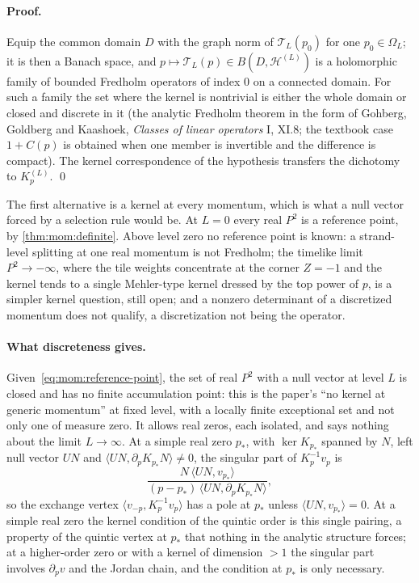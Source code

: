 \paragraph{Proof.}
Equip the common domain $D$ with the graph norm of $\mathcal T_L(p_0)$ for one $p_0 \in \Omega_L$; it is then a Banach space, and $p \mapsto \mathcal T_L(p) \in B(D, \mathcal H^{(L)})$ is a holomorphic family of bounded Fredholm operators of index $0$ on a connected domain.
For such a family the set where the kernel is nontrivial is either the whole domain or closed and discrete in it (the analytic Fredholm theorem in the form of Gohberg, Goldberg and Kaashoek, \emph{Classes of linear operators} I, XI.8; the textbook case $1 + C(p)$ is obtained when one member is invertible and the difference is compact).
The kernel correspondence of the hypothesis transfers the dichotomy to $K^{(L)}_p$. \qed

The first alternative is a kernel at every momentum, which is what a null vector forced by a selection rule would be.
At $L = 0$ every real $P^2$ is a reference point, by \cref{thm:mom:definite}.
Above level zero no reference point is known: a strand-level splitting at one real momentum is not Fredholm; the timelike limit $P^2 \to - \infty$, where the tile weights concentrate at the corner $Z = -1$ and the kernel tends to a single Mehler-type kernel dressed by the top power of $p$, is a simpler kernel question, still open; and a nonzero determinant of a discretized momentum does not qualify, a discretization not being the operator.

\paragraph{What discreteness gives.}
Given~\eqref{eq:mom:reference-point}, the set of real $P^2$ with a null vector at level $L$ is closed and has no finite accumulation point: this is the paper's ``no kernel at generic momentum'' at fixed level, with a locally finite exceptional set and not only one of measure zero.
It allows real zeros, each isolated, and says nothing about the limit $L \to \infty$.
At a simple real zero $p_*$, with $\ker K_{p_*}$ spanned by $N$, left null vector $U N$ and $\langle U N, \partial_p K_{p_*} N \rangle \ne 0$, the singular part of $K_p^{-1} v_p$ is
\begin{equation}
  \label{eq:mom:simple-zero}
  \frac{N \, \langle U N, v_{p_*} \rangle}{(p - p_*) \, \langle U N, \partial_p K_{p_*} N \rangle},
\end{equation}
so the exchange vertex $\langle v_{-p}, K_p^{-1} v_p \rangle$ has a pole at $p_*$ unless $\langle U N, v_{p_*} \rangle = 0$.
At a simple real zero the kernel condition of the quintic order is this single pairing, a property of the quintic vertex at $p_*$ that nothing in the analytic structure forces; at a higher-order zero or with a kernel of dimension $> 1$ the singular part involves $\partial_p v$ and the Jordan chain, and the condition at $p_*$ is only necessary.

